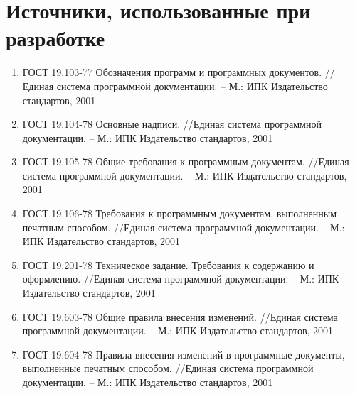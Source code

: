 \section{Источники, использованные при разработке}

\begin{enumerate}
    \item\label{itm:1} ГОСТ 19.103-77 Обозначения программ и программных документов.
    //Единая система программной документации.
    -- М.: ИПК Издательство стандартов, 2001
    \item\label{itm:2} ГОСТ 19.104-78 Основные надписи.
    //Единая система программной документации.
    -- М.: ИПК Издательство стандартов, 2001
    \item\label{itm:3} ГОСТ 19.105-78 Общие требования к программным документам.
    //Единая система программной документации.
    -- М.: ИПК Издательство стандартов, 2001
    \item\label{itm:4} ГОСТ 19.106-78 Требования к программным документам, выполненным печатным способом.
    //Единая система программной документации.
    -- М.: ИПК Издательство стандартов, 2001
    \item\label{itm:5} ГОСТ 19.201-78 Техническое задание.
    Требования к содержанию и оформлению.
    //Единая система программной документации.
    -- М.: ИПК Издательство стандартов, 2001
    \item\label{itm:6} ГОСТ 19.603-78 Общие правила внесения изменений.
    //Единая система программной документации.
    -- М.: ИПК Издательство стандартов, 2001
    \item\label{itm:7} ГОСТ 19.604-78 Правила внесения изменений в программные документы, выполненные печатным способом.
    //Единая система программной документации.
    -- М.: ИПК Издательство стандартов, 2001
\end{enumerate}